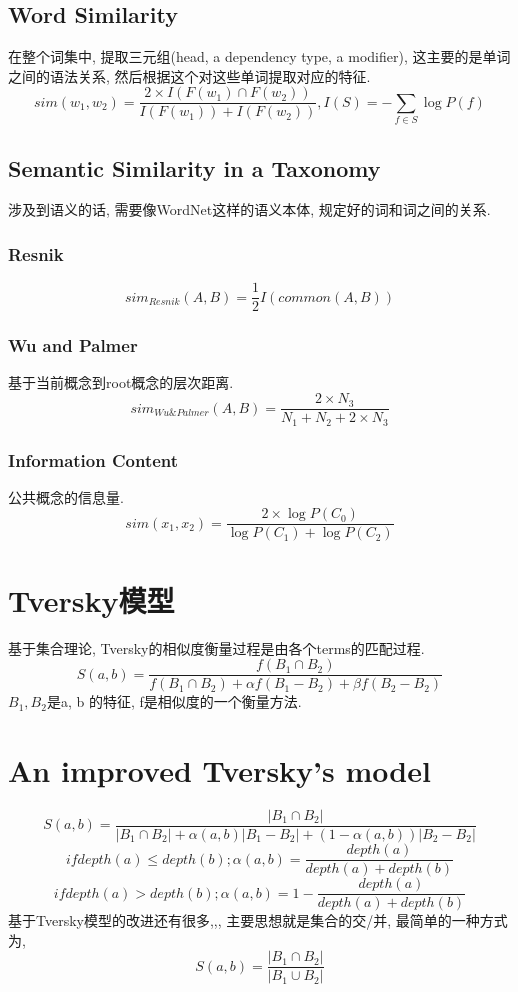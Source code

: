 \documentclass[a4paper,10pt,english]{article}
\begin{document}
\subsection{Word Similarity}
在整个词集中, 提取三元组(head, a dependency type, a modifier), 这主要的是单词之间的语法关系, 然后根据这个对这些单词提取对应的特征.
$$ sim(w_1, w_2) = \frac{2 \times I(F(w_1) \cap F(w_2))}{I(F(w_1)) + I(F(w_2))}, I(S) = - \sum_{f \in S} \log P(f) $$

\subsection{Semantic Similarity in a Taxonomy}
涉及到语义的话, 需要像WordNet这样的语义本体, 规定好的词和词之间的关系.
\subsubsection{Resnik}
$$ sim_{Resnik}(A, B)=\frac{1}{2}I(common(A,B)) $$
\subsubsection{Wu and Palmer}
基于当前概念到root概念的层次距离.
$$ sim_{Wu \& Palmer}(A, B) = \frac{2 \times N_3}{N_1+N_2+2 \times N_3} $$
\subsubsection{Information Content}
公共概念的信息量.
$$ sim(x_1, x_2) = \frac{2 \times \log P(C_0)}{\log P(C_1) + \log P(C_2)} $$


\section{Tversky模型}
基于集合理论, Tversky的相似度衡量过程是由各个terms的匹配过程.
$$ S(a, b) = \frac{f(B_1 \cap B_2 )}{f(B_1 \cap B_2 )+\alpha f(B_1 - B_2 )+\beta f(B_2 - B_2 )} $$
$B_1, B_2$是a, b 的特征, f是相似度的一个衡量方法.

\section{An improved Tversky's model}
$$ S(a, b) = \frac{\lvert B_1 \cap B_2 \rvert}{\lvert B_1 \cap B_2 \rvert+\alpha(a, b)\lvert B_1 - B_2 \rvert+(1-\alpha(a, b))\lvert B_2 - B_2 \rvert} $$
$$ if depth(a) \leq depth(b); \alpha(a, b)=\frac{depth(a)}{depth(a) + depth(b)} $$
$$ if depth(a) > depth(b); \alpha(a, b)=1-\frac{depth(a)}{depth(a) + depth(b)} $$
基于Tversky模型的改进还有很多,,, 主要思想就是集合的交/并, 最简单的一种方式为,
$$ S(a, b) = \frac{\lvert B_1 \cap B_2 \rvert}{\lvert B_1 \cup B_2 \rvert} $$
\end{document}
